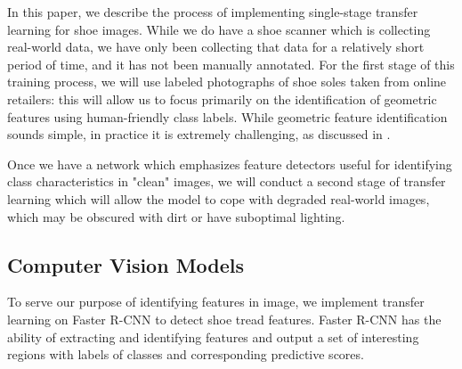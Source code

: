 \documentclass[10pt]{article}
\newcommand{\svp}[1]{{\textcolor{RedOrange}{#1}}}
\begin{document}
\svp{In this paper, we describe the process of implementing single-stage transfer learning for shoe images. While we do have a shoe scanner which is collecting real-world data, we have only been collecting that data for a relatively short period of time, and it has not been manually annotated. For the first stage of this training process, we will use labeled photographs of shoe soles taken from online retailers: this will allow us to focus primarily on the identification of geometric features using human-friendly class labels. While geometric feature identification sounds simple, in practice it is extremely challenging, as discussed in \Cref{sec:classification-scheme}.}


\svp{Once we have a network which emphasizes feature detectors useful for identifying class characteristics in "clean" images, we will conduct a second stage of transfer learning which will allow the model to cope with degraded real-world images, which may be obscured with dirt or have suboptimal lighting.}


\subsection{Computer Vision Models}


To serve our purpose of identifying features in image, we implement transfer learning on Faster R-CNN to detect shoe tread features. Faster R-CNN has the ability of extracting and identifying features and output a set of interesting regions with labels of classes and corresponding predictive scores.
\end{document}
